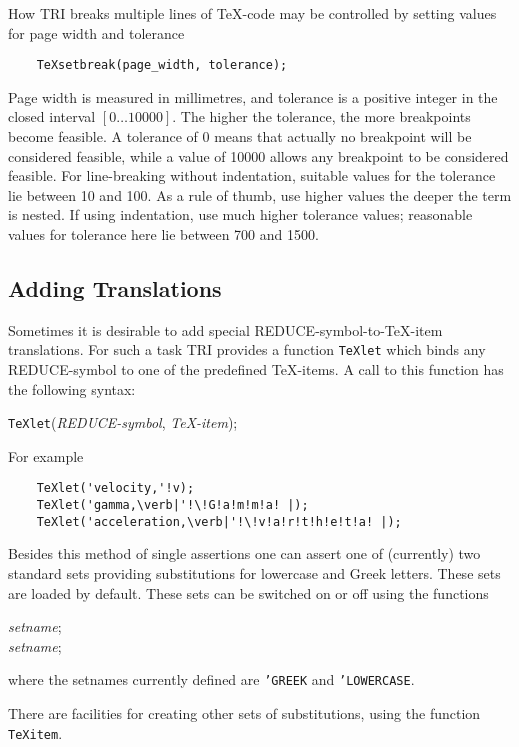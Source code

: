 How TRI breaks multiple lines of \TeX-code may be controlled by
setting  values for page width and tolerance
\begin{verbatim}
    TeXsetbreak(page_width, tolerance);
\end{verbatim}

Page width is measured in millimetres, and tolerance is a positive
integer in the closed interval $[0\ldots10000]$.
The higher the tolerance, the more breakpoints become feasible.
A tolerance of 0 means that actually no breakpoint will be considered
feasible, while a value of 10000 allows any breakpoint to be
considered feasible.
For line-breaking without indentation, suitable values for the
tolerance lie between 10 and 100.  As a rule of thumb, use
higher values the deeper the term is nested.  If using indentation,
use much higher tolerance values; reasonable values for
tolerance here lie between 700 and 1500.


\subsection{Adding Translations}

Sometimes it is desirable to add special REDUCE-symbol-to-\TeX-item
translations.  For such a task TRI provides a function
{\tt TeXlet} which binds any REDUCE-symbol to one of the predefined
\TeX-items.  A call to this function has the following syntax:

{\tt TeXlet}({\em REDUCE-symbol}, {\em \TeX-item});

For example
\begin{verbatim}
    TeXlet('velocity,'!v);
    TeXlet('gamma,\verb|'!\!G!a!m!m!a! |);
    TeXlet('acceleration,\verb|'!\!v!a!r!t!h!e!t!a! |);
\end{verbatim}

Besides this method of single assertions one can assert
one of (currently) two standard sets providing substitutions
for lowercase and Greek letters.  These sets are loaded by default.
These sets can be switched on or off using the functions

 {\em setname};\\
 {\em setname};

where the setnames currently defined are {\tt 'GREEK} and {\tt 'LOWERCASE}.

There are facilities for creating other sets of substitutions, using
the function {\tt TeXitem}.

